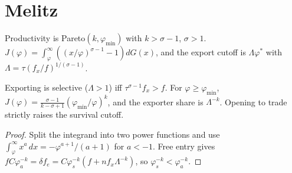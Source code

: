 \section{Melitz}

\begin{definition}
\label{def:melitz}
\leanok
Productivity is Pareto$(k,\varphi_{\min})$ with $k>\sigma-1$, $\sigma>1$. $J(\varphi)=\int_\varphi^\infty((x/\varphi)^{\sigma-1}-1)dG(x)$,
and the export cutoff is $\Lambda\varphi^*$ with $\Lambda=\tau(f_x/f)^{1/(\sigma-1)}$.
\end{definition}

\begin{theorem}
\label{thm:melitz}
\leanok
{}
Exporting is selective ($\Lambda>1$) iff $\tau^{\sigma-1}f_x>f$. For $\varphi\ge\varphi_{\min}$,
$J(\varphi)=\frac{\sigma-1}{k-\sigma+1}(\varphi_{\min}/\varphi)^k$, and the exporter share is $\Lambda^{-k}$. Opening to trade
strictly raises the survival cutoff.
\end{theorem}
\begin{proof}
\leanok
Split the integrand into two power functions and use $\int_\varphi^\infty x^a\,dx=-\varphi^{a+1}/(a+1)$ for $a<-1$.
Free entry gives $fC\varphi_a^{-k}=\delta f_e=C\varphi_s^{-k}(f+nf_x\Lambda^{-k})$, so $\varphi_s^{-k}<\varphi_a^{-k}$.
\end{proof}
